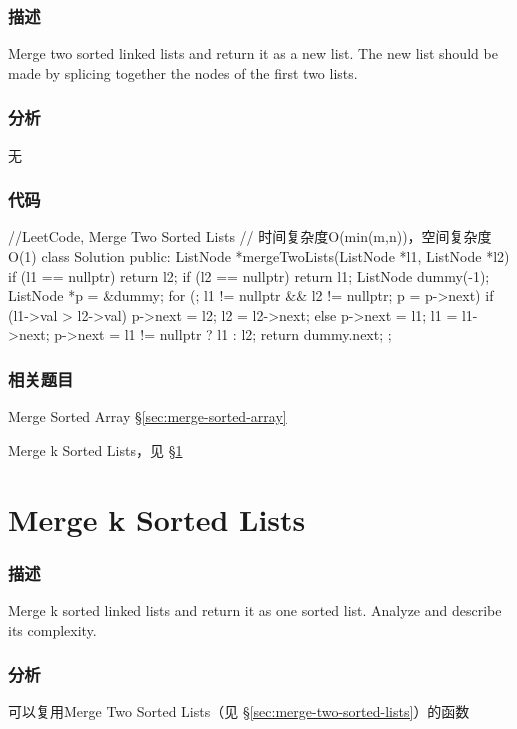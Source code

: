 \subsubsection{描述}
Merge two sorted linked lists and return it as a new list. The new list should be made by splicing together the nodes of the first two lists.


\subsubsection{分析}
无


\subsubsection{代码}
\begin{Code}
//LeetCode, Merge Two Sorted Lists
// 时间复杂度O(min(m,n))，空间复杂度O(1)
class Solution {
public:
    ListNode *mergeTwoLists(ListNode *l1, ListNode *l2) {
        if (l1 == nullptr) return l2;
        if (l2 == nullptr) return l1;
        ListNode dummy(-1);
        ListNode *p = &dummy;
        for (; l1 != nullptr && l2 != nullptr; p = p->next) {
            if (l1->val > l2->val) { p->next = l2; l2 = l2->next; }
            else { p->next = l1; l1 = l1->next; }
        }
        p->next = l1 != nullptr ? l1 : l2;
        return dummy.next;
    }
};
\end{Code}


\subsubsection{相关题目}
\begindot
\item Merge Sorted Array \S \ref{sec:merge-sorted-array}
\item Merge k Sorted Lists，见 \S \ref{sec:merge-k-sorted-lists}
\myenddot


\section{Merge k Sorted Lists} %
\label{sec:merge-k-sorted-lists}


\subsubsection{描述}
Merge k sorted linked lists and return it as one sorted list. Analyze and describe its complexity.


\subsubsection{分析}
可以复用Merge Two Sorted Lists（见 \S \ref{sec:merge-two-sorted-lists}）的函数


